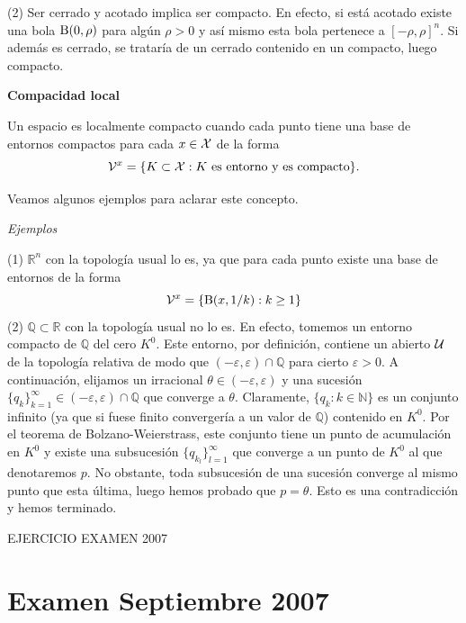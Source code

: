 \begin{itemize}
\begin{obs}
(2) Ser cerrado y acotado implica ser compacto. En efecto, si está acotado existe una bola $\operatorname{B}(0,\rho)$ para algún $\rho >0$ y así mismo esta bola pertenece a $[-\rho,\rho]^n$. Si además es cerrado, se trataría de un cerrado contenido en un compacto, luego compacto. 
\end{obs}

\textbf{Compacidad local}

\begin{defi} Un espacio es localmente compacto cuando cada punto tiene una base de entornos compactos para cada $x\in \mathcal{X}$ de la forma 
\[\mathcal{V}^x=\{K\subset \mathcal{X}: K\text{ es entorno y es compacto}\}.\]
\end{defi}

Veamos algunos ejemplos para aclarar este concepto. 

\textit{Ejemplos}

(1) $\mathbb{R}^n$ con la topología usual lo es, ya que para cada punto existe una base de entornos de la forma
\[\mathcal{V}^x=\{\operatorname{B}(x,1/k):k\geq 1\}\]
(2) $\mathbb{Q}\subset \mathbb{R}$ con la topología usual no lo es. En efecto, tomemos un entorno compacto de $\mathbb{Q}$ del cero $K^0$. Este entorno, por definición, contiene un abierto $\mathcal{U}$ de la topología relativa de modo que $(-\varepsilon,\varepsilon)\cap \mathbb{Q}$ para cierto $\varepsilon>0$. A continuación, elijamos un irracional $\theta \in (-\varepsilon,\varepsilon)$ y una sucesión $\{q_k\}_{k=1}^\infty\in (-\varepsilon,\varepsilon)\cap \mathbb{Q}$ que converge a $\theta$. Claramente, $\{q_k:k\in \mathbb{N}\}$ es un conjunto infinito (ya que si fuese finito convergería a un valor de $\mathbb{Q}$) contenido en $K^0$. Por el teorema de Bolzano-Weierstrass, este conjunto tiene un punto de acumulación en $K^0$ y existe una subsucesión $\{q_{k_l}\}_{l=1}^\infty$ que converge a un punto de $K^0$ al que denotaremos $p$. No obstante, toda subsucesión de una sucesión converge al mismo punto que esta última, luego hemos probado que $p=\theta$. Esto es una contradicción y hemos terminado. 

EJERCICIO EXAMEN 2007

\section{Examen Septiembre 2007}

\end{itemize}
